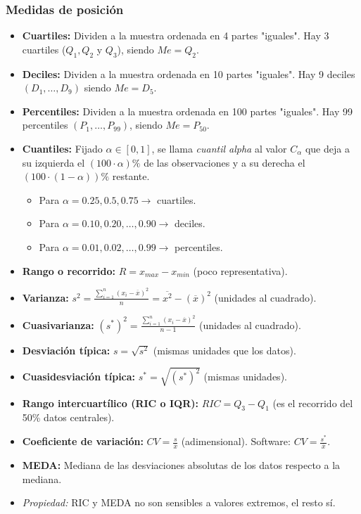 \subsubsection{Medidas de posición}
\begin{itemize}
	\item \textbf{Cuartiles:} Dividen a la muestra ordenada en 4 partes "iguales". Hay 3 cuartiles ($Q_1, Q_2$ y $Q_3$), siendo $Me=Q_2$.
	\item \textbf{Deciles:} Dividen a la muestra ordenada en 10 partes "iguales". Hay 9 deciles $(D_1, \hdots, D_9)$ siendo $Me=D_5$.
	\item \textbf{Percentiles:} Dividen a la muestra ordenada en 100 partes "iguales". Hay 99 percentiles $(P_1, \hdots, P_99)$, siendo $Me=P_50$.
	\item \textbf{Cuantiles:} Fijado $\alpha \in [0, 1]$, se llama \textit{cuantil alpha} al valor $C_{\alpha}$ que deja a su izquierda el $(100\cdot \alpha)\%$ de las observaciones y a su derecha el $(100\cdot (1-\alpha))\%$ restante.
	\begin{itemize}
		\item Para $\alpha=0.25, 0.5, 0.75 \rightarrow$ cuartiles.
		\item Para $\alpha=0.10, 0.20, \hdots,0.90 \rightarrow$ deciles.
		\item Para $\alpha=0.01, 0.02, \hdots, 0.99 \rightarrow$ percentiles.
	\end{itemize}
	\item \textbf{Rango o recorrido:} $R=x_{max}-x_{min}$ (poco representativa).
	\item \textbf{Varianza:} $s^{2}=\frac{\sum_{i=1}^{n}{(x_{i}-\overline{x})^2}}{n}=\overline{x^{2}}-(\overline{x})^{2}$ (unidades al cuadrado).
	\item \textbf{Cuasivarianza:} $(s^{*})^{2}=\frac{\sum_{i=1}^{n}{(x_{i}-\overline{x})^2}}{n-1}$ (unidades al cuadrado).
	\item \textbf{Desviación típica:} $s=\sqrt{s^{2}}$ (mismas unidades que los datos).
	\item \textbf{Cuasidesviación típica:} $s^{*}=\sqrt{(s^{*})^{2}}$ (mismas unidades).
	\item \textbf{Rango intercuartílico (RIC o IQR):} $RIC=Q_{3}-Q_{1}$ (es el recorrido del 50\% datos centrales).
	\item \textbf{Coeficiente de variación:} $CV=\frac{s}{\overline{x}}$ (adimensional). Software: $CV=\frac{s^{*}}{\overline{x}}$.
	\item \textbf{MEDA:} Mediana de las desviaciones absolutas de los datos respecto a la mediana.
	\item \textit{Propiedad:} RIC y MEDA no son sensibles a valores extremos, el resto sí.
\end{itemize}
